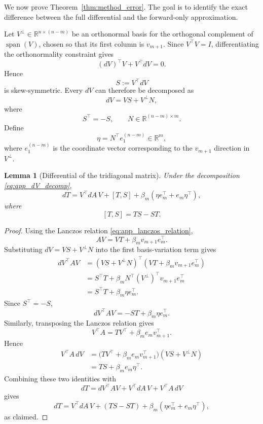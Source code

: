 \documentclass{article}
\newtheorem{lemma}[theorem]{Lemma}
\begin{document}
We now prove Theorem~\ref{thm:method_error}. The goal is to identify the exact
difference between the full differential and the forward-only approximation.

Let \(V^\perp\in\mathbb{R}^{n\times(n-m)}\) be an orthonormal basis for the orthogonal
complement of \(\operatorname{span}(V)\), chosen so that its first column is
\(v_{m+1}\). Since \(V^\top V=I\), differentiating the orthonormality constraint gives
\[
    (dV)^\top V+V^\top dV=0.
\]
Hence
\[
    S:=V^\top dV
\]
is skew-symmetric. Every \(dV\) can therefore be decomposed as
\begin{equation}
    dV = VS+V^\perp N,
    \label{eq:app_dV_decomp}
\end{equation}
where
\[
    S^\top=-S,
    \qquad
    N\in\mathbb{R}^{(n-m)\times m}.
\]
Define
\begin{equation}
    \eta = N^\top e_1^{(n-m)}\in\mathbb{R}^m,
    \label{eq:app_eta}
\end{equation}
where \(e_1^{(n-m)}\) is the coordinate vector corresponding to the \(v_{m+1}\)
direction in \(V^\perp\).

\begin{lemma}[Differential of the tridiagonal matrix]
\label{lem:app_dT}
Under the decomposition \eqref{eq:app_dV_decomp},
\begin{equation}
    dT
    =
    V^\top dA\,V
    +
    [T,S]
    +
    \beta_m(\eta e_m^\top+e_m\eta^\top),
    \label{eq:app_dT_decomp}
\end{equation}
where
\[
    [T,S]=TS-ST .
\]
\end{lemma}

\begin{proof}
Using the Lanczos relation \eqref{eq:app_lanczos_relation},
\[
    AV = VT+\beta_m v_{m+1}e_m^\top .
\]
Substituting \(dV=VS+V^\perp N\) into the first basis-variation term gives
\begin{align}
    dV^\top AV
    &=
    (VS+V^\perp N)^\top
    (VT+\beta_m v_{m+1}e_m^\top) \\
    &=
    S^\top T
    +
    \beta_m N^\top (V^\perp)^\top v_{m+1}e_m^\top \\
    &=
    S^\top T+\beta_m\eta e_m^\top .
\end{align}
Since \(S^\top=-S\),
\[
    dV^\top AV
    =
    -ST+\beta_m\eta e_m^\top .
\]
Similarly, transposing the Lanczos relation gives
\[
    V^\top A
    =
    TV^\top+\beta_m e_m v_{m+1}^\top .
\]
Hence
\begin{align}
    V^\top A\,dV
    &=
    \bigl(TV^\top+\beta_m e_m v_{m+1}^\top\bigr)(VS+V^\perp N) \\
    &=
    TS+\beta_m e_m\eta^\top .
\end{align}
Combining these two identities with
\[
    dT=dV^\top AV+V^\top dA\,V+V^\top A\,dV
\]
gives
\[
    dT
    =
    V^\top dA\,V
    +
    (TS-ST)
    +
    \beta_m(\eta e_m^\top+e_m\eta^\top),
\]
as claimed.
\end{proof}
\end{document}
